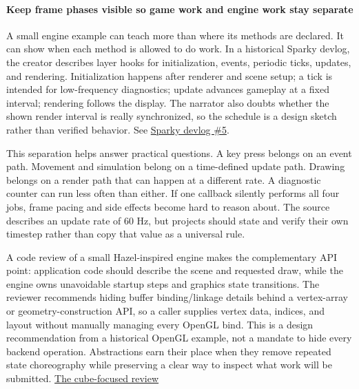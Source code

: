 \paragraph{Keep frame phases visible so game work and engine work stay separate}\label{05-engine-i-ch013-keep-frame-phases-visible-so-game-work-and-engine-work-stay-separate}

\hypertarget{05-engine-i-ch013-keep-frame-phases-visible-so-game-work-and-engine-work-stay-separate}{}

A small engine example can teach more than where its methods are declared. It can show when each method is allowed to do work. In a historical Sparky devlog, the creator describes layer hooks for initialization, events, periodic ticks, updates, and rendering. Initialization happens after renderer and scene setup; a tick is intended for low-frequency diagnostics; update advances gameplay at a fixed interval; rendering follows the display. The narrator also doubts whether the shown render interval is really synchronized, so the schedule is a design sketch rather than verified behavior. See \href{https://www.youtube.com/watch?v=zqmgcQd6ayc&t=6m30s}{Sparky devlog \#5}.

This separation helps answer practical questions. A key press belongs on an event path. Movement and simulation belong on a time-defined update path. Drawing belongs on a render path that can happen at a different rate. A diagnostic counter can run less often than either. If one callback silently performs all four jobs, frame pacing and side effects become hard to reason about. The source describes an update rate of 60 Hz, but projects should state and verify their own timestep rather than copy that value as a universal rule.

A code review of a small Hazel-inspired engine makes the complementary API point: application code should describe the scene and requested draw, while the engine owns unavoidable startup steps and graphics state transitions. The reviewer recommends hiding buffer binding/linkage details behind a vertex-array or geometry-construction API, so a caller supplies vertex data, indices, and layout without manually managing every OpenGL bind. This is a design recommendation from a historical OpenGL example, not a mandate to hide every backend operation. Abstractions earn their place when they remove repeated state choreography while preserving a clear way to inspect what work will be submitted. \href{https://www.youtube.com/watch?v=sIAXLH7ZqCw&t=10m26s}{The cube-focused review}

